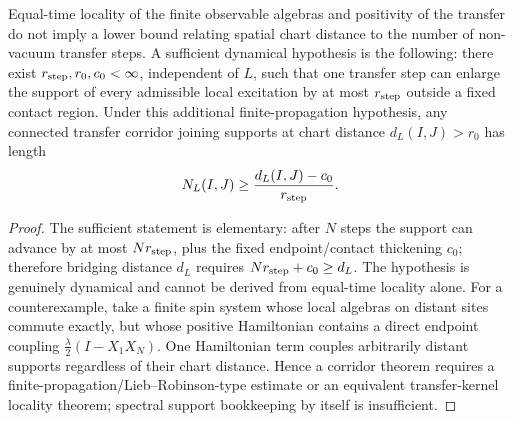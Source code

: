 \documentclass[12pt,a4paper]{article}
\begin{document}
\begin{theorem}
\label{p12:thm:euclidean-corridor-transfer}
Equal-time locality of the finite observable algebras and positivity of the transfer do not imply a lower bound relating spatial chart distance to the number of non-vacuum transfer steps.  A sufficient dynamical hypothesis is the following: there exist \(r_{\rm step},r_0,c_0<\infty\), independent of \(L\), such that one transfer step can enlarge the support of every admissible local excitation by at most \(r_{\rm step}\) outside a fixed contact region.  Under this additional finite-propagation hypothesis, any connected transfer corridor joining supports at chart distance \(d_L(I,J)>r_0\) has length
\begin{equation}
\label{p12:eq:euclidean-corridor-transfer-length}
N_L(I,J)\ge \frac{d_L(I,J)-c_0}{r_{\rm step}}.
\end{equation}
\end{theorem}
\begin{proof}
The sufficient statement is elementary: after \(N\) steps the support can advance by at most \(Nr_{\rm step}\), plus the fixed endpoint/contact thickening \(c_0\); therefore bridging distance \(d_L\) requires \(Nr_{\rm step}+c_0\ge d_L\).  The hypothesis is genuinely dynamical and cannot be derived from equal-time locality alone.  For a counterexample, take a finite spin system whose local algebras on distant sites commute exactly, but whose positive Hamiltonian contains a direct endpoint coupling \(\frac{\lambda}{2}(I-X_1X_N)\).  One Hamiltonian term couples arbitrarily distant supports regardless of their chart distance.  Hence a corridor theorem requires a finite-propagation/Lieb--Robinson-type estimate or an equivalent transfer-kernel locality theorem; spectral support bookkeeping by itself is insufficient.
\end{proof}
\end{document}

